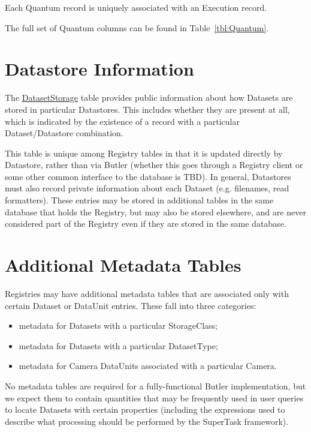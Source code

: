 \documentclass[DM,toc]{lsstdoc}
\newcommand{\tblref}[1]{\hyperref[tbl:#1]{#1}}
\newcommand{\coltable}[1]{
    \begin{table}[htb]
        {
            \footnotesize
            
        }
        \caption{#1 Columns}
        \label{tbl:#1}
    \end{table}
}
\begin{document}
Each Quantum record is uniquely associated with an Execution record.

The full set of Quantum columns can be found in Table~\ref{tbl:Quantum}.

\coltable{Quantum}

\section{Datastore Information}
\label{sec:datastore-information}

The \tblref{DatasetStorage} table provides public information about how Datasets are stored in particular Datastores.  This includes whether they are present at all, which is indicated by the existence of a record with a particular Dataset/Datastore combination.

\coltable{DatasetStorage}

This table is unique among Registry tables in that it is updated directly by Datastore, rather than via Butler (whether this goes through a Registry client or some other common interface to the database is TBD).
In general, Datastores must also record private information about each Dataset (e.g. filenames, read formatters).
These entries may be stored in additional tables in the same database that holds the Registry, but may also be stored elsewhere, and are never considered part of the Registry even if they are stored in the same database.

\section{Additional Metadata Tables}
\label{sec:metadata}

Registries may have additional metadata tables that are associated only with certain Dataset or DataUnit entries.
These fall into three categories:
\begin{itemize}
    \item metadata for Datasets with a particular StorageClass;
    \item metadata for Datasets with a particular DatasetType;
    \item metadata for Camera DataUnits associated with a particular Camera.
\end{itemize}
No metadata tables are required for a fully-functional Butler implementation, but we expect them to contain quantities that may be frequently used in user queries to locate Datasets with certain properties (including the expressions used to describe what processing should be performed by the SuperTask framework).
\end{document}
